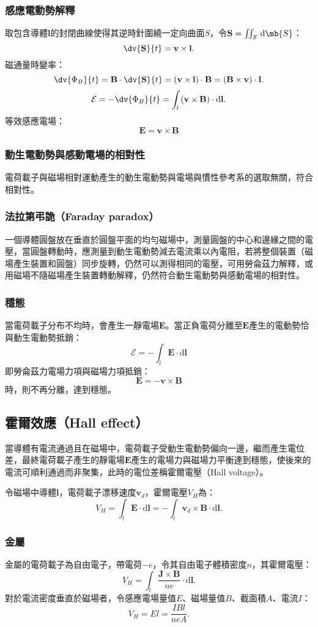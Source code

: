 \documentclass[a4paper,12pt]{report}
\begin{document}
\begin{itemize}
\subsubsection{感應電動勢解釋}
取包含導體$\mathbf{l}$的封閉曲線使得其逆時針圍繞一定向曲面$S$，令$\mathbf{S}=\iint_S\,\mathrm{d}\mb{S}$：
\[\dv{\mathbf{S}}{t}=\mathbf{v}\times\mathbf{l}.\]
磁通量時變率：
\[\dv{\Phi_B}{t}=\mathbf{B}\cdot\dv{\mathbf{S}}{t}=(\mathbf{v}\times\mathbf{l})\cdot\mathbf{B}=(\mathbf{B}\times\mathbf{v})\cdot\mathbf{l}.\]
\[\mathcal{E}=-\dv{\Phi_B}{t}=\int_{l}\left(\mathbf{v}\times\mathbf{B}\right)\cdot\mathrm{d}\mathbf{l}.\]
等效感應電場：
\[\mathbf{E}=\mathbf{v}\times\mathbf{B}\]
\subsubsection{動生電動勢與感動電場的相對性}
電荷載子與磁場相對運動產生的動生電動勢與電場與慣性參考系的選取無關，符合相對性。
\subsubsection{法拉第弔詭（Faraday paradox）}
一個導體圓盤放在垂直於圓盤平面的均勻磁場中，測量圓盤的中心和邊緣之間的電壓，當圓盤轉動時，應測量到動生電動勢減去電流乘以內電阻，若將整個裝置（磁場產生裝置和圓盤）同步旋轉，仍然可以測得相同的電壓，可用勞侖茲力解釋，或用磁場不隨磁場產生裝置轉動解釋，仍然符合動生電動勢與感動電場的相對性。
\subsubsection{穩態}
當電荷載子分布不均時，會產生一靜電場$\mathbf{E}$。當正負電荷分離至$\mathbf{E}$產生的電動勢恰與動生電動勢抵銷：
\[\mathcal{E}=-\int_l\mathbf{E}\cdot\mathrm{d}\mathbf{l}\]
即勞侖茲力電場力項與磁場力項抵銷：
\[\mathbf{E}=-\mathbf{v}\times\mathbf{B}\]
時，則不再分離，達到穩態。
\subsection{霍爾效應（Hall effect）}
當導體有電流通過且在磁場中，電荷載子受動生電動勢偏向一邊，繼而產生電位差，最終電荷載子產生的靜電場$\mathbf{E}$產生的電場力與磁場力平衡達到穩態，使後來的電流可順利通過而非聚集，此時的電位差稱霍爾電壓（Hall voltage）。

令磁場中導體$\mathbf{l}$，電荷載子漂移速度$\mathbf{v}_d$，霍爾電壓$V_H$為：
\[V_H=\int_{l}\mathbf{E}\cdot\mathrm{d}\mathbf{l}=-\int_{l}\mathbf{v}_d\times\mathbf{B}\cdot\mathrm{d}\mathbf{l}.\]
\subsubsection{金屬}
金屬的電荷載子為自由電子，帶電荷$-e$，令其自由電子體積密度$n$，其霍爾電壓：
\[V_H=\int_{l}\frac{\mathbf{J}\times\mathbf{B}}{ne}\cdot\mathrm{d}\mathbf{l}.\]
對於電流密度垂直於磁場者，令感應電場量值$E$、磁場量值$B$、截面積$A$、電流$I$：
\[V_H=E l=\frac{IB l}{neA}.\]

\end{itemize}
\end{document}
